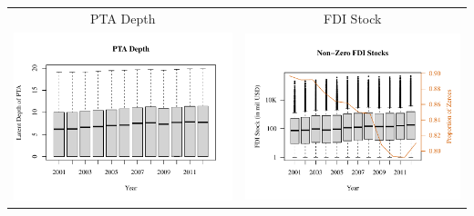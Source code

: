 \documentclass[reqno,onecolumn,letterpaper,12pt]{article}
\begin{document}
\begin{longtable}{c@{\hskip -.8cm}c}
PTA Depth & FDI Stock\\
\includegraphics[height=.17\textheight, clip=true, trim=0cm 1cm 0cm 2cm]{SI_figures/descriptive_plots/ptadepth_boxplot.pdf} &
\includegraphics[height=.17\textheight, clip=true, trim=0cm 1cm 0cm 2cm]{SI_figures/descriptive_plots/fdi_stock_zeroes_boxplot.pdf}  \\


\end{longtable}
\end{document}
